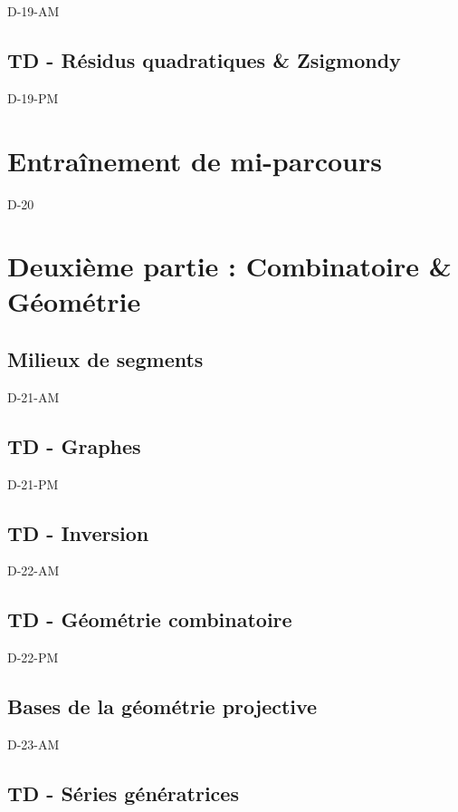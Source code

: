 \documentclass[poly,trombi]{valbonne}
\begin{document}
{D-19-AM}

\subsection{TD - Résidus quadratiques \& Zsigmondy}
{D-19-PM}


\section{Entraînement de mi-parcours}

{D-20}


\section{Deuxième partie : Combinatoire \& Géométrie}

\subsection{Milieux de segments}

{D-21-AM}

\subsection{TD - Graphes}

{D-21-PM}

\subsection{TD - Inversion}

{D-22-AM}

\subsection{TD - Géométrie combinatoire}

{D-22-PM}

\subsection{Bases de la géométrie projective}

{D-23-AM}

\subsection{TD - Séries génératrices}
\end{document}
